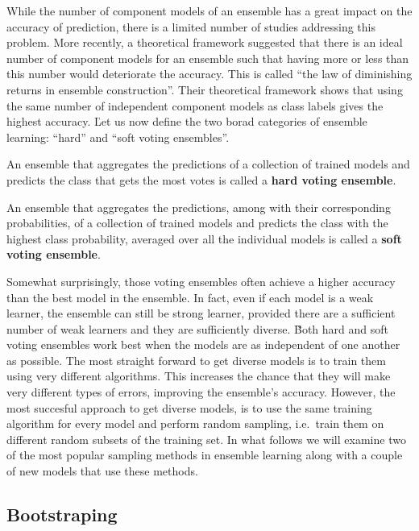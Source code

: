 While the number of component models of an ensemble has a great impact on the accuracy of prediction, there is a
limited number of studies addressing this problem. More recently, a theoretical framework suggested that there is an
ideal number of component models for an ensemble such that having more or less than this number  would deteriorate
the accuracy. This is called ``the law of diminishing returns in ensemble construction''. Their theoretical
framework shows that using the same number of independent component models as class labels gives the highest
accuracy. \v

Let us now define the two borad categories of ensemble learning: ``hard'' and ``soft voting ensembles''.

An ensemble that aggregates the predictions of a collection of trained models and predicts the class that gets the most
votes is called a \textbf{hard voting ensemble}.
\ed

An ensemble that aggregates the predictions, among with their corresponding probabilities, of a collection of trained
models and predicts the class with the highest class probability, averaged over all the individual models is called a
\textbf{soft voting ensemble}.
\ed


Somewhat surprisingly, those voting ensembles often achieve a higher accuracy than the best model in the ensemble.
In fact, even if each model is a weak learner, the ensemble can still be strong learner, provided there are a
sufficient number of weak learners and they are sufficiently diverse. \v

Both hard and soft voting ensembles work best when the models are as independent of one another as possible. The
most straight forward to get diverse models is to train them using very different algorithms. This increases the
chance that they will make very different types of errors, improving the ensemble's accuracy. However, the most
succesful approach to get diverse models, is to use the same training algorithm for every model and perform random
sampling, i.e.\ train them on different random subsets of the training set. In what follows we will examine two of
the most popular sampling methods in ensemble learning along with a couple of new models that use these methods.

\subsection{Bootstraping}

